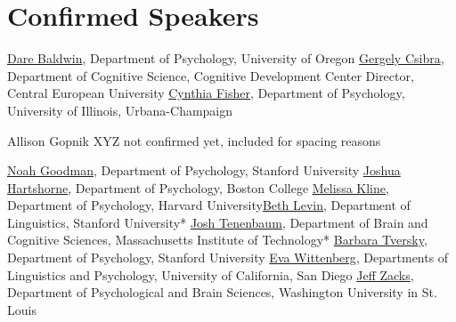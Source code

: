 \documentclass[10pt,letterpaper]{article}
\begin{document}
\section{Confirmed Speakers}
  
\href{http://baldwinlab.uoregon.edu/dr-dare-baldwin/}{Dare Baldwin}, Department of Psychology, University of Oregon
\href{https://people.ceu.edu/gergely_csibra}{Gergely Csibra}, Department of Cognitive Science, Cognitive Development Center Director, Central European University  
\href{http://www.psychology.illinois.edu/people/clfishe}{Cynthia Fisher}, Department of Psychology, University of Illinois, Urbana-Champaign
  
  Allison Gopnik XYZ not confirmed yet, included for spacing reasons
  
\href{http://cocolab.stanford.edu/ndg.html}{Noah Goodman}, Department of Psychology, Stanford University
\href{http://joshuakhartshorne.org/}{Joshua Hartshorne}, Department of Psychology, Boston College
\href{http://www.melissakline.net/}{Melissa Kline}, Department of Psychology, Harvard University\href{http://web.stanford.edu/~bclevin/}{Beth Levin}, Department of Linguistics, Stanford University*
\href{http://web.mit.edu/cocosci/josh.html}{Josh Tenenbaum}, Department of Brain and Cognitive Sciences, Massachusetts Institute of Technology*
\href{http://www-psych.stanford.edu/~bt/}{Barbara Tversky}, Department of Psychology, Stanford University
\href{http://evawittenberg.com/i/start.html}{Eva Wittenberg}, Departments of Linguistics and Psychology, University of California, San Diego  
\href{http://pages.wustl.edu/dcl/jeff-zacks/}{Jeff Zacks}, Department of Psychological and Brain Sciences, Washington University in St. Louis




\setlength{\bibleftmargin}{.125in}
\setlength{\bibindent}{-\bibleftmargin}


\end{document}
